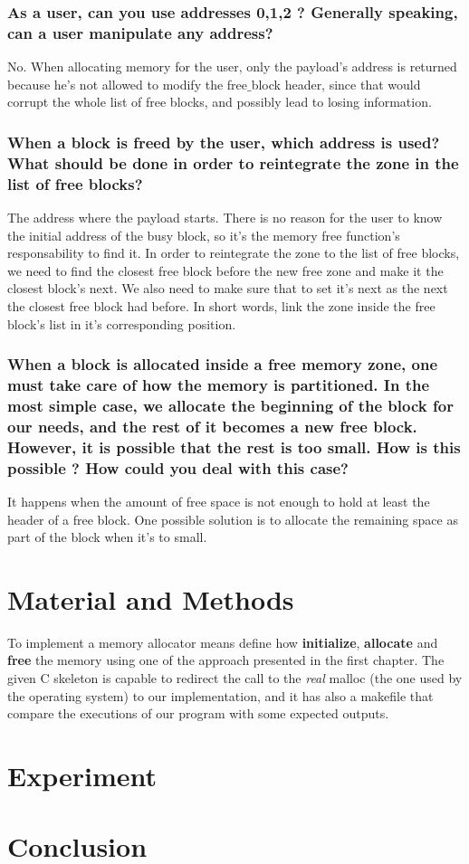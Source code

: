 \documentclass[11pt]{article}
\begin{document}
\subsubsection*{As a user, can you use addresses 0,1,2 ? Generally speaking, can a user manipulate any address?}
No. When allocating memory for the user, only the payload's address is returned because he's not allowed to modify  the free$\_$block header, since that would corrupt the whole list of free blocks, and possibly lead to losing information.

\subsubsection*{When a block is freed by the user, which address is used? What should be done in order to reintegrate the zone in the list of free blocks?}
The address where the payload starts. There is no reason for the user to know the initial address of the busy block, so it's the memory free function's responsability to find it. 
In order to reintegrate the zone to the list of free blocks, we need to find the closest free block before the new free zone and make it the closest block's next. We also need to make sure that to set it's next as the next the closest free block had before. In short words, link the zone inside the free block's list in it's corresponding position.

\subsubsection*{When a block is allocated inside a free memory zone, one must take care of how the memory is partitioned. In the most simple case, we allocate the beginning of the block for our needs, and the rest of it becomes a new free block. However, it is possible that the rest is too small. How is this possible ? How could you deal with this case?}
It happens when the amount of free space is not enough to hold at least the header of a free block. One possible solution is to allocate the remaining space as part of the block when it's to small.

\section{Material and Methods}

To implement a memory allocator means define how \textbf{initialize}, \textbf{allocate} and \textbf{free} the memory using one of the approach presented in the first chapter. The given C skeleton is capable to redirect the call to the \textit{real} malloc (the one used by the operating system) to our implementation, and it has also a makefile that compare the executions of our program with some expected outputs.
 
\section{Experiment}
\section{Conclusion}
\end{document}
